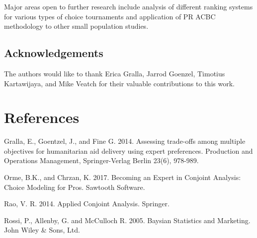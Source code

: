 \documentclass[a4paper, 12pt]{article}
\begin{document}
Major areas open to further research include analysis of  different ranking systems for various types of choice tournaments and application of PR ACBC methodology to other small population studies. 



\subsection*{Acknowledgements} 

The authors would like to thank
Erica Gralla, Jarrod Goenzel, Timotius Kartawijaya, and Mike Veatch for their valuable contributions to this work.


\section*{References}
\begin{list}{}{\itemindent=-2em}
\small


\item Gralla, E., Goentzel, J., and Fine G. 2014. Assessing trade-offs among multiple objectives for humanitarian aid delivery using expert preferences.
Production and Operations Management, Springer-Verlag Berlin 23(6), 978-989.

\item Orme, B.K., and Chrzan, K. 2017. Becoming an Expert in Conjoint Analysis: Choice Modeling for Pros. Sawtooth Software.

\item Rao, V. R. 2014. Applied Conjoint Analysis. Springer.


\item Rossi, P., Allenby, G. and McCulloch R. 2005. Baysian Statistics and Marketing. John Wiley \& Sons, Ltd.


\end{list}
\end{document}

